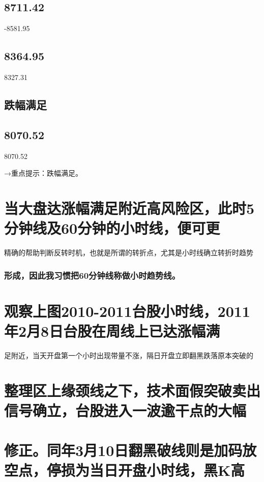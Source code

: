 \documentclass{article}
\begin{document}
\subsection{8711.42}

-8581.95

\subsection{8364.95}

8327.31

\subsection{跌幅满足}

\subsection{8070.52}

8070.52

→重点提示：跌幅满足。

\section{当大盘达涨幅满足附近高风险区，此时5分钟线及60分钟的小时线，便可更}

精确的帮助判断反转时机，也就是所谓的转折点，尤其是小时线确立转折时趋势

\subsubsection{形成，因此我习惯把60分钟线称做小时趋势线。}

\section{观察上图2010-2011台股小时线，2011年2月8日台股在周线上已达涨幅满}

足附近，当天开盘第一个小时出现带量不涨，隔日开盘立即翻黑跌落原本突破的

\section{整理区上缘颈线之下，技术面假突破卖出信号确立，台股进入一波逾干点的大幅}

\section{修正。同年3月10日翻黑破线则是加码放空点，停损为当日开盘小时线，黑K高}
\end{document}
